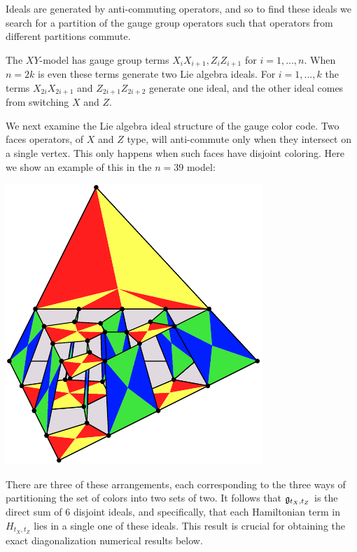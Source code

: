 \documentclass[12pt]{article}
\begin{document}
Ideals are generated by anti-commuting operators,
and so to find these ideals we search for a partition of
the gauge group operators such that operators from
different partitions commute.

The $XY$-model has gauge group
terms $X_i X_{i+1}, Z_i Z_{i+1}$ for $i=1,...,n.$
When $n=2k$ is even 
these terms generate two Lie algebra ideals.
For $i=1,...,k$
the terms $X_{2i}X_{2i+1}$ and $Z_{2i+1}Z_{2i+2}$ 
generate one ideal, and the other ideal comes from switching $X$ and $Z.$

We next examine the Lie algebra ideal structure of the gauge color code.
Two faces operators, of $X$ and $Z$ type,
will anti-commute only when
they intersect on a single vertex.
This only happens when such faces have disjoint coloring.
Here we show an example of this in the $n=39$ model:
\begin{center}
\includegraphics{pic-gcolor-ideal.pdf}
\end{center}
There are three of these arrangements,
each corresponding to the three ways of
partitioning the set of colors into two sets of two.
It follows that $\mathfrak{g}_{t_X,t_Z}$ 
is the direct sum of 6 disjoint ideals,
and specifically, that each Hamiltonian term in $H_{t_X,t_Z}$
lies in a single one of these ideals.
This result is crucial for obtaining the exact
diagonalization numerical results below.

\end{document}
